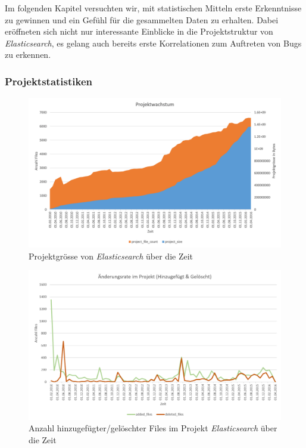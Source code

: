 \documentclass[10pt, a4paper]{article}
\begin{document}
Im folgenden Kapitel versuchten wir, mit statistischen Mitteln erste Erkenntnisse zu gewinnen und ein Gefühl für die gesammelten Daten zu erhalten. Dabei eröffneten sich nicht nur interessante Einblicke in die Projektstruktur von \emph{Elasticsearch}, es gelang auch bereits erste Korrelationen zum Auftreten von Bugs zu erkennen.

\subsubsection{Projektstatistiken} \label{sec:project_statistics}

\begin{figure}[!ht]
	\centering
	\includegraphics[width=1\textwidth]{resources/images/chart_project_growth.png}
	\caption{Projektgrösse von \emph{Elasticsearch} über die Zeit}
	\label{fig:projectgrowth}
\end{figure}

\begin{figure}[!ht]
	\centering
	\includegraphics[width=1\textwidth]{resources/images/chart_project_change_rate_1.png}
	\caption{Anzahl hinzugefügter/gelöschter Files im Projekt \emph{Elasticsearch} über die Zeit}
	\label{fig:addeddeletedfiles}
\end{figure}
\end{document}
